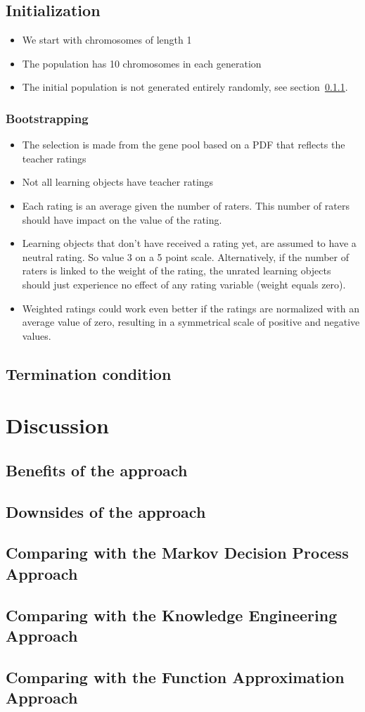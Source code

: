 \subsection{Initialization}
\begin{itemize}
	\item We start with chromosomes of length 1
	\item The population has 10 chromosomes in each generation
	\item The initial population is not generated entirely randomly, see
		section~\ref{sec:approach_bootstrapping}.
\end{itemize}
\subsubsection{Bootstrapping}
\label{sec:approach_bootstrapping}
\begin{itemize}
	\item The selection is made from the gene pool based on a PDF that reflects
		the teacher ratings
	\item Not all learning objects have teacher ratings
	\item Each rating is an average given the number of raters. This number of raters should have impact on the value of the rating.
	\item Learning objects that don't have received a rating yet, are assumed
		to have a neutral rating. So value 3 on a 5 point scale. Alternatively, if the number of raters is linked to the weight of the rating, the unrated learning objects should just experience no effect of any rating variable (weight equals zero).
	\item Weighted ratings could work even better if the ratings are normalized with an average value of zero, resulting in a symmetrical scale of positive and negative values.
\end{itemize}
\subsection{Termination condition}
\section{Discussion}
\subsection{Benefits of the approach}
\subsection{Downsides of the approach}
\subsection{Comparing with the Markov Decision Process Approach}
\subsection{Comparing with the Knowledge Engineering Approach}
\subsection{Comparing with the Function Approximation Approach}
